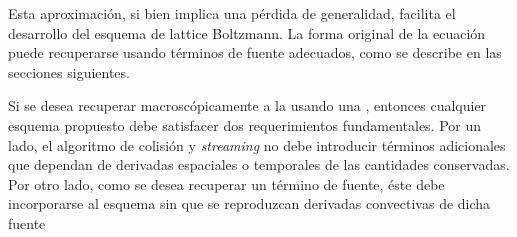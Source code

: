 Esta aproximaci\'on, si bien implica una p\'erdida de generalidad, facilita el desarrollo del esquema de lattice Boltzmann. La forma original de la ecuaci\'on puede recuperarse usando t\'erminos de fuente adecuados, como se describe en las secciones siguientes.

Si se desea recuperar macrosc\'opicamente a la  usando una \lbe{}, entonces cualquier esquema propuesto debe satisfacer dos requerimientos fundamentales. Por un lado, el algoritmo de colisi\'on y \emph{streaming} no debe introducir t\'erminos adicionales que dependan de derivadas espaciales o temporales de las cantidades conservadas. Por otro lado, como se desea recuperar un t\'ermino de fuente, \'este debe incorporarse al esquema sin que se reproduzcan derivadas convectivas de dicha fuente 